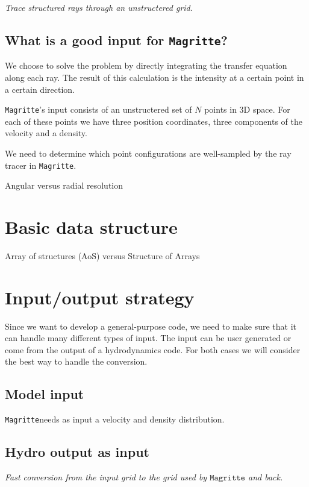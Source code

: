 \documentclass[]{article}
\newcommand{\Magritte}{\texttt{Magritte}}
\begin{document}
\emph{Trace structured rays through an unstructered grid.}

\subsection{What is a good input for \Magritte?}
We choose to solve the problem by directly integrating the transfer equation along each ray. The result of this calculation is the intensity at a certain point in a certain direction.


\Magritte's input consists of an unstructered set of $N$ points in 3D space. For each of these points we have three position coordinates, three components of the velocity and a density.

\bigskip

We need to determine which point configurations are well-sampled by the ray tracer in \Magritte.

Angular versus radial resolution


\section{Basic data structure}

Array of structures (AoS) versus Structure of Arrays


\section{Input/output strategy}

Since we want to develop a general-purpose code, we need to make sure that it can handle many different types of input. The input can be user generated or come from the output of a hydrodynamics code. For both cases we will consider the best way to handle the conversion.


\subsection{Model input}

\Magritte needs as input a velocity and density distribution.


\subsection{Hydro output as input}
\bigskip

\emph{Fast conversion from the input grid to the grid used by $\Magritte$ and back.}
\end{document}
